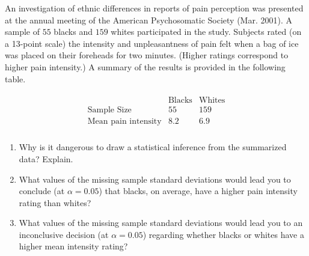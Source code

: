 
\begin{exercise}

An investigation of ethnic differences in reports of pain perception was presented at the annual meeting of the American Psychosomatic Society (Mar. 2001).
A sample of $55$ blacks and $159$ whites participated in the study.
Subjects rated (on a 13-point scale) the intensity and unpleasantness of pain felt when a bag of ice was placed on their foreheads for two minutes.
(Higher ratings correspond to higher pain intensity.)
A summary of the results is provided in the following table.

\begin{align*}
    \begin{array}{l|cc}
                                   & \text{Blacks} & \text{Whites} \\ \hline
        \text{Sample Size}         & 55            & 159           \\
        \text{Mean pain intensity} & 8.2           & 6.9           \\
    \end{array}
\end{align*}

\begin{enumerate}[label = (\alph*)]

    \item Why is it dangerous to draw a statistical inference from the summarized data?
    Explain.

    \item What values of the missing sample standard deviations would lead you to conclude (at $\alpha = 0.05$) that blacks, on average, have a higher pain intensity rating than whites?

    \item What values of the missing sample standard deviations would lead you to an inconclusive decision (at $\alpha = 0.05$) regarding whether blacks or whites have a higher mean intensity rating?

\end{enumerate}

\end{exercise}


\begin{solution}

\phantom{}

\end{solution}

